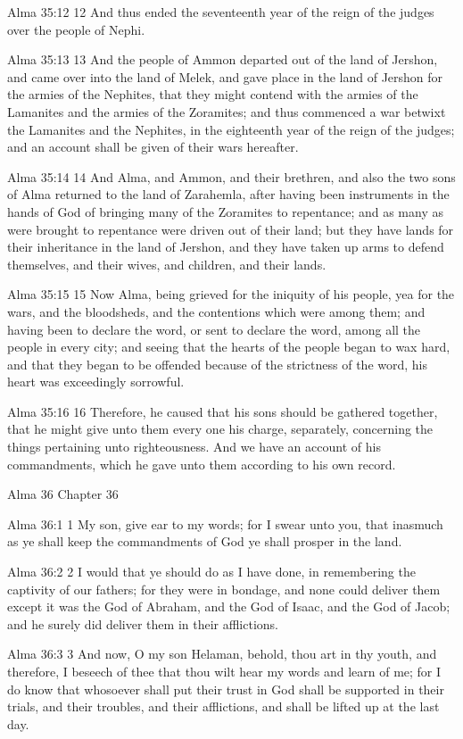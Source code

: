 Alma 35:12
 12 And thus ended the seventeenth year of the reign of the
judges over the people of Nephi.

Alma 35:13
 13 And the people of Ammon departed out of the land of Jershon,
and came over into the land of Melek, and gave place in the land
of Jershon for the armies of the Nephites, that they might
contend with the armies of the Lamanites and the armies of the
Zoramites; and thus commenced a war betwixt the Lamanites and the
Nephites, in the eighteenth year of the reign of the judges; and
an account shall be given of their wars hereafter.

Alma 35:14
 14 And Alma, and Ammon, and their brethren, and also the two
sons of Alma returned to the land of Zarahemla, after having been
instruments in the hands of God of bringing many of the Zoramites
to repentance; and as many as were brought to repentance were
driven out of their land; but they have lands for their
inheritance in the land of Jershon, and they have taken up arms
to defend themselves, and their wives, and children, and their
lands.

Alma 35:15
 15 Now Alma, being grieved for the iniquity of his people, yea
for the wars, and the bloodsheds, and the contentions which were
among them; and having been to declare the word, or sent to
declare the word, among all the people in every city; and seeing
that the hearts of the people began to wax hard, and that they
began to be offended because of the strictness of the word, his
heart was exceedingly sorrowful.

Alma 35:16
 16 Therefore, he caused that his sons should be gathered
together, that he might give unto them every one his charge,
separately, concerning the things pertaining unto righteousness.
And we have an account of his commandments, which he gave unto
them according to his own record.

Alma 36
Chapter 36

Alma 36:1
 1 My son, give ear to my words; for I swear unto you, that
inasmuch as ye shall keep the commandments of God ye shall
prosper in the land.

Alma 36:2
 2 I would that ye should do as I have done, in remembering the
captivity of our fathers; for they were in bondage, and none
could deliver them except it was the God of Abraham, and the God
of Isaac, and the God of Jacob; and he surely did deliver them in
their afflictions.

Alma 36:3
 3 And now, O my son Helaman, behold, thou art in thy youth, and
therefore, I beseech of thee that thou wilt hear my words and
learn of me; for I do know that whosoever shall put their trust
in God shall be supported in their trials, and their troubles,
and their afflictions, and shall be lifted up at the last day.

